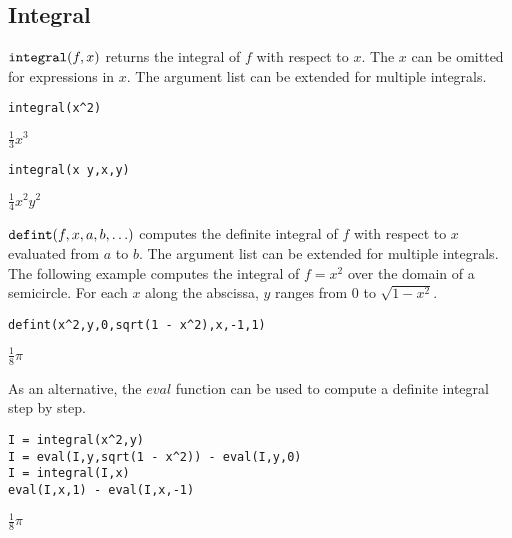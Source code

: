 \subsection{Integral}

$\text{\tt integral}(f,x)$ returns the integral of $f$ with respect to $x$.
The $x$ can be omitted for expressions in $x$.
The argument list can be extended for multiple integrals.

{\color{blue}
\begin{verbatim}
integral(x^2)
\end{verbatim}
}

\noindent
$\displaystyle \tfrac{1}{3}x^3$

{\color{blue}
\begin{verbatim}
integral(x y,x,y)
\end{verbatim}
}

\noindent
$\displaystyle \tfrac{1}{4}x^2y^2$

\bigskip
\noindent
$\text{\tt defint}(f,x,a,b,\ldots)$
computes the definite integral of $f$ with respect to $x$ evaluated from
$a$ to $b$.
The argument list can be extended for multiple integrals.
The following example computes the integral of $f=x^2$
over the domain of a semicircle.
For each $x$ along the abscissa, $y$ ranges from 0 to $\sqrt{1-x^2}$.

{\color{blue}
\begin{verbatim}
defint(x^2,y,0,sqrt(1 - x^2),x,-1,1)
\end{verbatim}
}

\noindent
$\displaystyle \tfrac{1}{8}\pi$

\bigskip
\noindent
As an alternative, the $eval$ function can be used to compute a definite integral step by step.

{\color{blue}
\begin{verbatim}
I = integral(x^2,y)
I = eval(I,y,sqrt(1 - x^2)) - eval(I,y,0)
I = integral(I,x)
eval(I,x,1) - eval(I,x,-1)
\end{verbatim}
}

\noindent
$\displaystyle \tfrac{1}{8}\pi$
